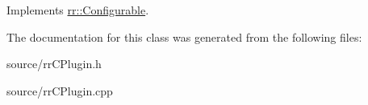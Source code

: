 Implements \hyperlink{classrr_1_1_configurable_add9f6002952f1d4a4672ead64b5821ab}{rr\-::\-Configurable}.



The documentation for this class was generated from the following files\-:\begin{DoxyCompactItemize}
\item 
source/rr\-C\-Plugin.\-h\item 
source/rr\-C\-Plugin.\-cpp\end{DoxyCompactItemize}
